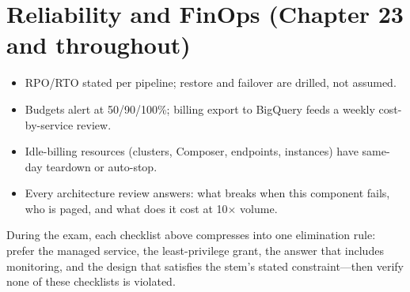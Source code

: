 \section{Reliability and FinOps (Chapter 23 and throughout)}
\begin{itemize}
    \item[$\square$] RPO/RTO stated per pipeline; restore and failover are drilled, not assumed.
    \item[$\square$] Budgets alert at 50/90/100\%; billing export to BigQuery feeds a weekly
    cost-by-service review.
    \item[$\square$] Idle-billing resources (clusters, Composer, endpoints, instances) have
    same-day teardown or auto-stop.
    \item[$\square$] Every architecture review answers: what breaks when this component fails, who
    is paged, and what does it cost at 10$\times$ volume.
\end{itemize}

\begin{tipbox}
During the exam, each checklist above compresses into one elimination rule: prefer the managed
service, the least-privilege grant, the answer that includes monitoring, and the design that
satisfies the stem's stated constraint---then verify none of these checklists is violated.
\end{tipbox}
